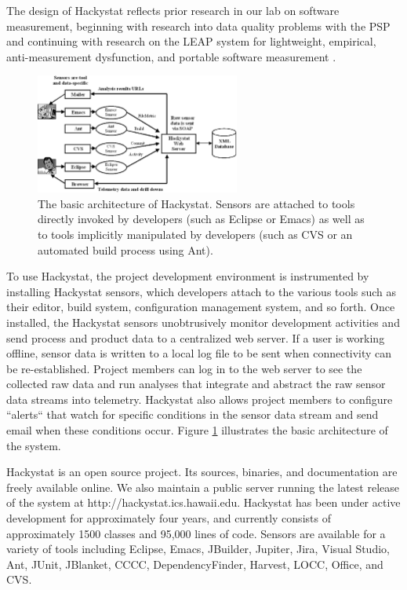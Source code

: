 The design of Hackystat \cite{csdl2-02-07} reflects prior 
research in our lab on software measurement, beginning with research into
data quality problems with the PSP \cite{csdl-98-11} and continuing with
research on the LEAP system for lightweight, empirical, anti-measurement
dysfunction, and portable software measurement \cite{csdl2-00-03}.

\begin{figure}[ht]
  \centering
  \includegraphics[width=0.60\textwidth]{architecture.eps}
  \caption{The basic architecture of Hackystat. Sensors are attached to
  tools directly invoked by developers (such as Eclipse or Emacs) as
  well as to tools implicitly manipulated by developers (such as CVS or 
  an automated build process using Ant).}
  \label{fig:architecture}
\end{figure}

To use Hackystat, the project development environment is 
instrumented by installing Hackystat sensors, which developers attach
to the various tools such as their editor, build system, configuration
management system, and so forth. Once installed, the Hackystat sensors
unobtrusively monitor development activities and send process and
product data to a centralized web server.  If a user is working
offline, sensor data is written to a local log file to be sent
when connectivity can be re-established.
Project members can log in to the web server to see the collected
raw data and run analyses that integrate and abstract the raw sensor
data streams into telemetry.  Hackystat also allows project members to
configure ``alerts`` that watch for specific conditions in the
sensor data stream and send email when these conditions occur. Figure
\ref{fig:architecture} illustrates the basic architecture of the system. 

Hackystat is an open source project. Its sources, binaries, and
documentation are freely available online.  We also maintain a public
server running the latest release of the system at
http://hackystat.ics.hawaii.edu.  Hackystat has been under active
development for approximately four years, and currently consists of
approximately 1500 classes and 95,000 lines of code.  Sensors are available
for a variety of tools including Eclipse, Emacs, JBuilder, Jupiter, Jira,
Visual Studio, Ant, JUnit, JBlanket, CCCC, DependencyFinder, Harvest, LOCC,
Office, and CVS.

